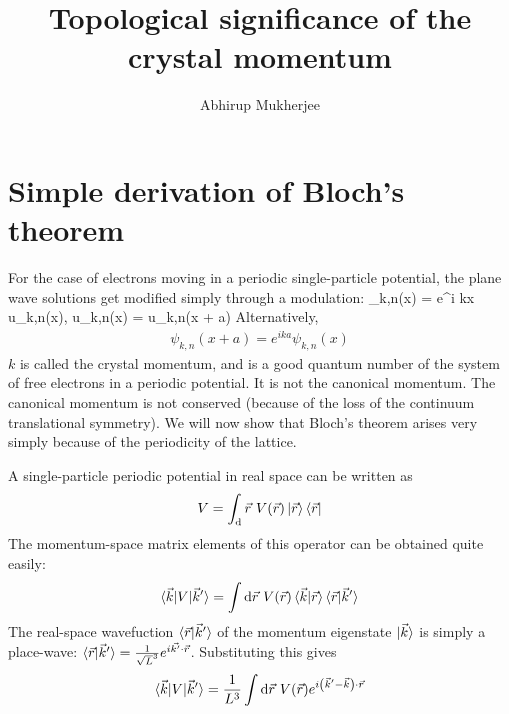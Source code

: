 \documentclass{article}
\begin{document}
\title{\textbf{Topological significance of the crystal momentum}}
\author{Abhirup Mukherjee}
\maketitle
{}
\section{Simple derivation of Bloch's theorem}

For the case of electrons moving in a periodic single-particle potential, the plane wave solutions get modified simply through a modulation:
\beq
\psi_{k,n}(x) = e^{i k\cdot x} u_{k,n}(x), \quad{}\quad u_{k,n}(x) = u_{k,n}(x + a)
\eeq
Alternatively,
\begin{equation}\begin{aligned}
	\label{Bloch}
	\psi_{k,n}(x + a) = e^{i k a} \psi_{k,n}(x)
\end{aligned}\end{equation}
\(k\) is called the crystal momentum, and is a good quantum number of the system of free electrons in a periodic potential. It is not the canonical momentum. The canonical momentum is not conserved (because of the loss of the continuum translational symmetry). We will now show that Bloch's theorem arises very simply because of the periodicity of the lattice.

A single-particle periodic potential in real space can be written as
\begin{equation}\begin{aligned}
	V = \int_ \mathrm{d}\vec r ~V(\vec r)\ket{\vec r}\bra{\vec r}
\end{aligned}\end{equation}
The momentum-space matrix elements of this operator can be obtained quite easily:
\begin{equation}\begin{aligned}
	\braket{\vec k | V | \vec k^\prime} =  \int \mathrm{d}\vec r ~V(\vec r)\braket{\vec k |\vec r}\braket{\vec r | \vec k^\prime}
\end{aligned}\end{equation}
The real-space wavefuction \(\braket{\vec r | \vec k^\prime}\) of the momentum eigenstate \(\ket{\vec k}\) is simply a place-wave: \(\braket{\vec r | \vec k^\prime} = \frac{1}{\sqrt L^3} e^{i \vec{k^\prime}\cdot\vec{r}}\). Substituting this gives
\begin{equation}\begin{aligned}
	\braket{\vec k | V | \vec k^\prime} =  \frac{1}{L^3}\int \mathrm{d}\vec r ~V(\vec r) e^{i\left( \vec k^\prime - \vec k \right) \cdot \vec r}
\end{aligned}\end{equation}
\end{document}
